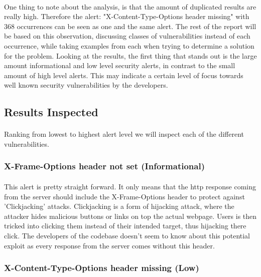 \documentclass[11pt,english,a4paper]{report}
\begin{document}
\paragraph{}
One thing to note about the analysis, is that the amount of duplicated results are really high. 
Therefore the alert: "X-Content-Type-Options header missing" with 368 occurrences can be seen as one and the same alert. 
The rest of the report will be based on this observation, discussing classes of vulnerabilities instead of each occurrence, while taking examples from each when trying to determine a solution for the problem.
Looking at the results, the first thing that stands out is the large amount informational and low level security alerts, in contrast to the small amount of high level alerts.
This may indicate a certain level of focus towards well known security vulnerabilities by the developers.

\subsection{Results Inspected}
\paragraph{}
Ranking from lowest to highest alert level we will inspect each of the different vulnerabilities.

\subsubsection{X-Frame-Options header not set (Informational)}
\paragraph{}
This alert is pretty straight forward.
It only means that the \gls{http} response coming from the server should include the X-Frame-Options header to protect against 'Clickjacking'\cite{clickjacking} attacks.
Clickjacking is a form of hijacking attack, where the attacker hides malicious buttons or links on top the actual webpage.
Users is then tricked into clicking them instead of their intended target, thus hijacking there click.
The developers of the codebase doesn't seem to know about this potential exploit as every response from the server comes without this header.

\subsubsection{X-Content-Type-Options header missing (Low)}
\end{document}
